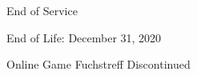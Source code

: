 %
%
%



\begin{frame}{End of Service}
	\begin{fancycolumns}
		\begin{exampletight}{{End of Life: December 31, 2020}}
			\centering{}
		\end{exampletight}
		\nextcolumn
		\begin{exampletight}{Online Game Fuchstreff Discontinued}
		\end{exampletight}
	\end{fancycolumns}
\end{frame}



